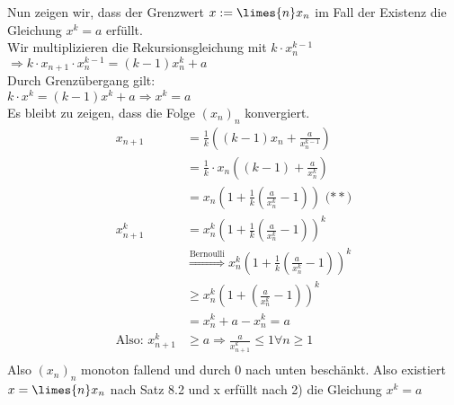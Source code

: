 \documentclass[12pt,a4paper,titlepage,draft]{article}
\begin{document}
\begin{bsp}
\begin{bew}
			Nun zeigen wir, dass der Grenzwert \(x := \limes{n} x_n\) im Fall der Existenz die Gleichung \(x^k = a\) erfüllt.\\
			Wir multiplizieren die Rekursionsgleichung mit \(k \cdot x_n^{k-1}\)\\
			\(\Rightarrow k \cdot x_{n+1} \cdot x_n^{k-1} = (k-1)x_n^k + a\)\\
			Durch Grenzübergang gilt:\\
			\(k \cdot x^k = (k-1)x^k + a \Rightarrow x^k = a \)\\
			Es bleibt zu zeigen, dass die Folge \((x_n)_n\) konvergiert.
			\begin{align*}
				x_{n+1} &= \frac{1}{k}\left((k-1)x_n + \frac{a}{x_n^{k-1}}\right)\\
				&= \frac{1}{k} \cdot x_n \left((k-1) + \frac{a}{x_n^{k}}\right)\\
				&= x_n \left(1 + \frac{1}{k}\left(\frac{a}{x_n^k} - 1\right)\right) \text{ (\(\ast \ast\))}\\
				x_{n+1}^k &= x_n^k\left(1+\frac{1}{k}\left(\frac{a}{x_n^k} - 1 \right)\right)^k\\
				&\overset{\text{Bernoulli}}{\Rightarrow} x_n^k\left(1+\frac{1}{k}\left(\frac{a}{x_n^k} - 1 \right)\right)^k\\
				&\geq x_n^k\left(1+\left(\frac{a}{x_n^k} - 1 \right)\right)^k\\
				&= x_n^k + a - x_n^k = a\\
				\text{Also: } x_{n+1}^k &\geq a \Rightarrow \frac{a}{x_{n+1}^k} \leq 1 \forall n \geq 1\\
			\end{align*}
			Also \((x_n)_n\) monoton fallend und durch 0 nach unten beschänkt. Also existiert \(x = \limes{n} x_n\) nach Satz 8.2 und x erfüllt nach 2) die Gleichung \(x^k = a\)
		\end{bew}
	\end{bsp}
\end{document}
